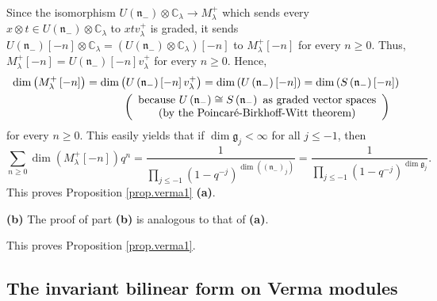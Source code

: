 \documentclass
[numbers=enddot,12pt,final,onecolumn,german,notitlepage]{scrartcl}%
\theoremstyle{definition}
\begin{document}
Since the isomorphism $U\left(  \mathfrak{n}_{-}\right)  \otimes
\mathbb{C}_{\lambda}\rightarrow M_{\lambda}^{+}$ which sends every $x\otimes
t\in U\left(  \mathfrak{n}_{-}\right)  \otimes\mathbb{C}_{\lambda}$ to
$xtv_{\lambda}^{+}$ is graded, it sends $U\left(  \mathfrak{n}_{-}\right)
\left[  -n\right]  \otimes\mathbb{C}_{\lambda}=\left(  U\left(  \mathfrak{n}%
_{-}\right)  \otimes\mathbb{C}_{\lambda}\right)  \left[  -n\right]  $ to
$M_{\lambda}^{+}\left[  -n\right]  $ for every $n\geq0$. Thus, $M_{\lambda
}^{+}\left[  -n\right]  =U\left(  \mathfrak{n}_{-}\right)  \left[  -n\right]
v_{\lambda}^{+}$ for every $n\geq0$. Hence,
\begin{align*}
\dim\left(  M_{\lambda}^{+}\left[  -n\right]  \right)   &  =\dim\left(
U\left(  \mathfrak{n}_{-}\right)  \left[  -n\right]  v_{\lambda}^{+}\right)
=\dim\left(  U\left(  \mathfrak{n}_{-}\right)  \left[  -n\right]  \right)
=\dim\left(  S\left(  \mathfrak{n}_{-}\right)  \left[  -n\right]  \right) \\
&  \ \ \ \ \ \ \ \ \ \ \left(
\begin{array}
[c]{c}%
\text{because }U\left(  \mathfrak{n}_{-}\right)  \cong S\left(  \mathfrak{n}%
_{-}\right)  \text{ as graded vector spaces}\\
\text{(by the Poincar\'{e}-Birkhoff-Witt theorem)}%
\end{array}
\right)
\end{align*}
for every $n\geq0$. This easily yields that if $\dim\mathfrak{g}_{j}<\infty$
for all $j\leq-1$, then%
\[
\sum\limits_{n\geq0}\dim\left(  M_{\lambda}^{+}\left[  -n\right]  \right)
q^{n}=\dfrac{1}{\prod\limits_{j\leq-1}\left(  1-q^{-j}\right)  ^{\dim\left(
\left(  \mathfrak{n}_{-}\right)  _{j}\right)  }}=\dfrac{1}{\prod
\limits_{j\leq-1}\left(  1-q^{-j}\right)  ^{\dim\mathfrak{g}_{j}}}.
\]
This proves Proposition \ref{prop.verma1} \textbf{(a)}.

\textbf{(b)} The proof of part \textbf{(b)} is analogous to that of
\textbf{(a)}.

This proves Proposition \ref{prop.verma1}.

\subsection{The invariant bilinear form on Verma modules}
\end{document}
